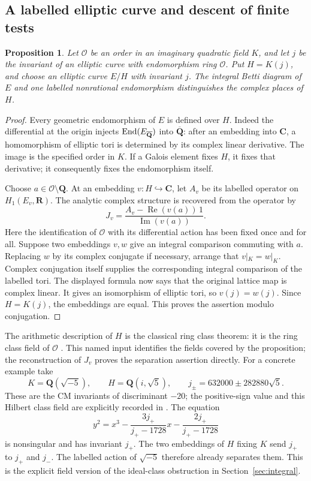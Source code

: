 \documentclass[11pt]{article}
\newtheorem{proposition}[theorem]{Proposition}
\theoremstyle{definition}\newtheorem{definition}[theorem]{Definition}
\theoremstyle{remark}\newtheorem{remark}[theorem]{Remark}
\newcommand{\Q}{\mathbf Q}\newcommand{\Z}{\mathbf Z}
\newcommand{\R}{\mathbf R}\newcommand{\C}{\mathbf C}
\newcommand{\Qb}{\overline{\mathbf Q}}\newcommand{\Fp}{\mathbf F_p}
\begin{document}
\subsection{A labelled elliptic curve and descent of finite tests}
\begin{proposition}\label{prop:ring-class-test}
Let $\mathcal O$ be an order in an imaginary quadratic field $K$, and let
$j$ be the invariant of an elliptic curve with endomorphism ring $\mathcal O$.
Put $H=K(j)$, and choose an elliptic curve $E/H$ with invariant $j$.
The integral Betti diagram of $E$ and one labelled nonrational endomorphism
distinguishes the complex places of $H$.
\end{proposition}
\begin{proof}
Every geometric endomorphism of $E$ is defined over $H$. Indeed the differential
at the origin injects $\End(E_{\Qb})$ into $\Qb$: after an embedding into $\C$,
a homomorphism of elliptic tori is determined by its complex linear derivative.
The image is the specified order in $K$. If a Galois element fixes $H$, it
fixes that derivative; it consequently fixes the endomorphism itself.

Choose $a\in\mathcal O\setminus\Q$. At an embedding $v:H\hookrightarrow\C$,
let $A_v$ be its labelled operator on $H_1(E_v,\R)$. The analytic complex
structure is recovered from the operator by
\[
 J_v=\frac{A_v-\operatorname{Re}(v(a))\,1}
                 {\operatorname{Im}(v(a))}.
\]
Here the identification of $\mathcal O$ with its differential action has
been fixed once and for all. Suppose two embeddings $v,w$ give an integral
comparison commuting with $a$. Replacing $w$ by its complex conjugate if
necessary, arrange that $v|_K=w|_K$. Complex conjugation itself supplies
the corresponding integral comparison of the labelled tori. The displayed
formula now says that the original lattice map is complex linear. It gives
an isomorphism of elliptic tori, so $v(j)=w(j)$. Since $H=K(j)$, the embeddings
are equal. This proves the assertion modulo conjugation.
\end{proof}

The arithmetic description of $H$ is the classical ring class theorem:
it is the ring class field of $\mathcal O$
\cite[Theorem~11.1, p.~220]{CoxClassFields}. This named input identifies the
fields covered by the proposition; the reconstruction of $J_v$ proves the
separation assertion directly. For a concrete example take
\[
 K=\Q(\sqrt{-5}),\qquad H=\Q(i,\sqrt5),\qquad
 j_\pm=632000\pm282880\sqrt5.
\]
These are the CM invariants of discriminant $-20$; the positive-sign value
and this Hilbert class field are explicitly recorded in
\cite[\S5, p.~11, before (19)]{CampagnaPengo}. The equation
\[
 y^2=x^3-\frac{3j_+}{j_+-1728}x
              -\frac{2j_+}{j_+-1728}
\]
is nonsingular and has invariant $j_+$. The two embeddings of $H$ fixing
$K$ send $j_+$ to $j_+$ and $j_-$. The labelled action of $\sqrt{-5}$
therefore already separates them. This is the explicit field version of
the ideal-class obstruction in Section~\ref{sec:integral}.
\end{document}
